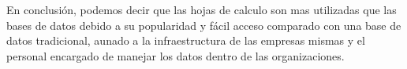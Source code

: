En conclusión, podemos decir que las hojas de calculo son mas utilizadas que las bases de datos debido a su popularidad y fácil acceso comparado con una base de datos tradicional, aunado a la infraestructura de las empresas mismas y el personal encargado de manejar los datos dentro de las organizaciones.\\
